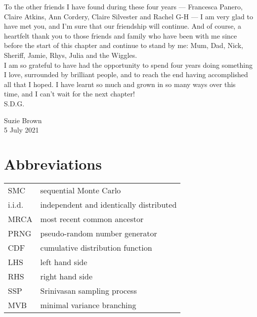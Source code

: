\documentclass[oneside]{scrbook} %
\theoremstyle{definition}
\newcommand{\1}[1]{\mathbbm{1}_{#1}} %
\begin{document}
{To the other friends I have found during these four years --- Francesca Panero, Claire Atkins, Ann Cordery, Claire Silvester and Rachel G-H --- I am very glad to have met you, and I'm sure that our friendship will continue.
And of course, a heartfelt thank you to those friends and family who have been with me since before the start of this chapter and continue to stand by me: Mum, Dad, Nick, Sheriff, Jamie, Rhys, Julia and the Wiggles.
\\

I am so grateful to have had the opportunity to spend four years doing something I love, surrounded by brilliant people, and to reach the end having accomplished all that I hoped. I have learnt so much and grown in so many ways over this time, and I can't wait for the next chapter!
\\

S.D.G.
\\

\begin{flushright}
Suzie Brown\\
5 July 2021
\end{flushright}
}




\tableofcontents
\listoffigures
\listoftables
\listofalgorithms






\chapter{Abbreviations}
\begin{tabular}{p{} p{}}
SMC & sequential Monte Carlo \\
i.i.d. & independent and identically distributed \\
MRCA & most recent common ancestor \\
PRNG & pseudo-random number generator \\
CDF & cumulative distribution function \\
LHS & left hand side \\
RHS & right hand side \\
SSP & Srinivasan sampling process \\
MVB & minimal variance branching \\
\end{tabular}
\end{document}
